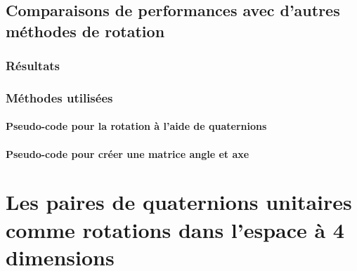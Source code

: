 	\subsection{Comparaisons de performances avec d'autres méthodes de rotation}
		
		\subsubsection{Résultats}
			
		\subsubsection{Méthodes utilisées}
			
			\paragraph{Pseudo-code pour la rotation à l'aide de quaternions}
				
			\paragraph{Pseudo-code pour créer une matrice angle et axe}
				
				
\section{Les paires de quaternions unitaires comme rotations dans l'espace à 4 dimensions}
	